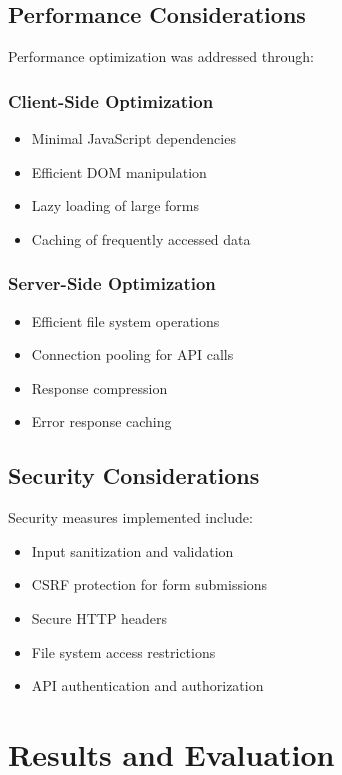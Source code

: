 \documentclass[11pt,a4paper]{article}
\begin{document}
\subsection{Performance Considerations}

Performance optimization was addressed through:

\subsubsection{Client-Side Optimization}
\begin{itemize}
    \item Minimal JavaScript dependencies
    \item Efficient DOM manipulation
    \item Lazy loading of large forms
    \item Caching of frequently accessed data
\end{itemize}

\subsubsection{Server-Side Optimization}
\begin{itemize}
    \item Efficient file system operations
    \item Connection pooling for API calls
    \item Response compression
    \item Error response caching
\end{itemize}

\subsection{Security Considerations}

Security measures implemented include:

\begin{itemize}
    \item Input sanitization and validation
    \item CSRF protection for form submissions
    \item Secure HTTP headers
    \item File system access restrictions
    \item API authentication and authorization
\end{itemize}

\section{Results and Evaluation}
\end{document}
